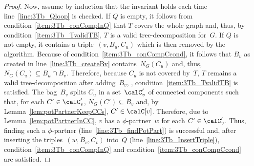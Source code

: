 \begin{proof}
Now, assume by induction that the invariant holds each time line~\ref{line:3Tb_Qloop} is checked.
If $Q$ is empty, it follows from condition~\ref{item:3Tb_conCompInQ} that $T$ covers the whole graph and, thus, by condition~\ref{item:3Tb_TvalidTB}, $T$ is a valid tree-decomposition for~$G$.
If $Q$ is not empty, it contains a triple~$(v, B_u, C_u)$ which is then removed by the algorithm.
Because of condition~\ref{item:3Tb_conCompCcond}, it follows that $B_v$ as created in line~\ref{line:3Tb_createBv} contains~$N_G(C_u)$ and, thus, $N_G(C_u) \subseteq B_u \cap B_v$.
Therefore, because $C_u$ is not covered by~$T$, $T$ remains a valid tree-decomposition after adding~$B_v$, \ie, condition~\ref{item:3Tb_TvalidTB} is satisfied.
The bag~$B_v$ splits $C_u$ in a set~$\calC_v'$ of connected components such that, for each $C' \in \calC_v'$, $N_G(C') \subseteq B_v$ and, by Lemma~\ref{lem:potPartnerKeepCCs}, $C' \in \calC[v]$.
Therefore, due to Lemma~\ref{lem:potPartnerInCC}, $v$ has a $\phi$-partner~$w$ for each $C' \in \calC_v'$.
Thus, finding such a $\phi$-partner (line~\ref{line:3Tb_findPotPart}) is successful and, after inserting the triples~$(w, B_v, C_v)$ into~$Q$ (line~\ref{line:3Tb_InsertTriple}), condition~\ref{item:3Tb_conCompInQ} and condition~\ref{item:3Tb_conCompCcond} are satisfied.
\end{proof}

